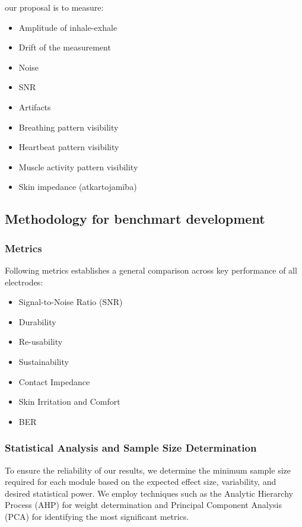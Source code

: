 our proposal is to measure:
\begin{itemize}
    \item Amplitude of inhale-exhale
    \item Drift of the measurement
    \item Noise
    \item SNR
    \item Artifacts
    \item Breathing pattern visibility
    \item Heartbeat pattern visibility
    \item Muscle activity pattern visibility
    \item Skin impedance (atkartojamība)
\end{itemize}

\subsection{Methodology for benchmart development}


\subsubsection{Metrics}

Following metrics establishes a general comparison across key performance of all electrodes:
\begin{itemize}
    \item Signal-to-Noise Ratio (SNR)
    \item Durability
    \item Re-usability
    \item Sustainability
    \item Contact Impedance
    \item Skin Irritation and Comfort
    \item BER
\end{itemize}

\subsubsection{Statistical Analysis and Sample Size Determination}

To ensure the reliability of our results, we determine the minimum sample size required for each module based on the expected effect size, variability, and desired statistical power. We employ techniques such as the Analytic Hierarchy Process (AHP) for weight determination and Principal Component Analysis (PCA) for identifying the most significant metrics.

